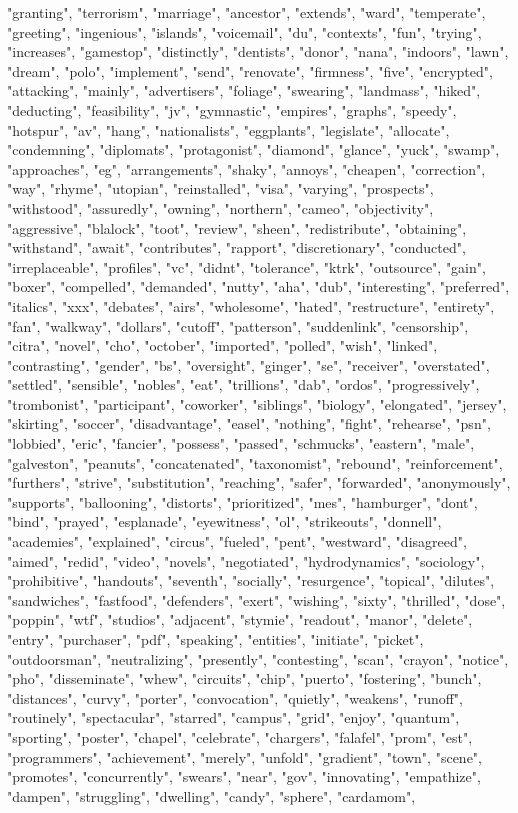 "granting", "terrorism", "marriage", "ancestor", "extends", "ward", "temperate", "greeting", "ingenious", "islands", "voicemail", "du", "contexts", "fun", "trying", "increases", "gamestop", "distinctly", "dentists", "donor", "nana", "indoors", "lawn", "dream", "polo", "implement", "send", "renovate", "firmness", "five", "encrypted", "attacking", "mainly", "advertisers", "foliage", "swearing", "landmass", "hiked", "deducting", "feasibility", "jv", "gymnastic", "empires", "graphs", "speedy", "hotspur", "av", "hang", "nationalists", "eggplants", "legislate", "allocate", "condemning", "diplomats", "protagonist", "diamond", "glance", "yuck", "swamp", "approaches", "eg", "arrangements", "shaky", "annoys", "cheapen", "correction", "way", "rhyme", "utopian", "reinstalled", "visa", "varying", "prospects", "withstood", "assuredly", "owning", "northern", "cameo", "objectivity", "aggressive", "blalock", "toot", "review", "sheen", "redistribute", "obtaining", "withstand", "await", "contributes", "rapport", "discretionary", "conducted", "irreplaceable", "profiles", "vc", "didnt", "tolerance", "ktrk", "outsource", "gain", "boxer", "compelled", "demanded", "nutty", "aha", "dub", "interesting", "preferred", "italics", "xxx", "debates", "airs", "wholesome", "hated", "restructure", "entirety", "fan", "walkway", "dollars", "cutoff", "patterson", "suddenlink", "censorship", "citra", "novel", "cho", "october", "imported", "polled", "wish", "linked", "contrasting", "gender", "bs", "oversight", "ginger", "se", "receiver", "overstated", "settled", "sensible", "nobles", "eat", "trillions", "dab", "ordos", "progressively", "trombonist", "participant", "coworker", "siblings", "biology", "elongated", "jersey", "skirting", "soccer", "disadvantage", "easel", "nothing", "fight", "rehearse", "psn", "lobbied", "eric", "fancier", "possess", "passed", "schmucks", "eastern", "male", "galveston", "peanuts", "concatenated", "taxonomist", "rebound", "reinforcement", "furthers", "strive", "substitution", "reaching", "safer", "forwarded", "anonymously", "supports", "ballooning", "distorts", "prioritized", "mes", "hamburger", "dont", "bind", "prayed", "esplanade", "eyewitness", "ol", "strikeouts", "donnell", "academies", "explained", "circus", "fueled", "pent", "westward", "disagreed", "aimed", "redid", "video", "novels", "negotiated", "hydrodynamics", "sociology", "prohibitive", "handouts", "seventh", "socially", "resurgence", "topical", "dilutes", "sandwiches", "fastfood", "defenders", "exert", "wishing", "sixty", "thrilled", "dose", "poppin", "wtf", "studios", "adjacent", "stymie", "readout", "manor", "delete", "entry", "purchaser", "pdf", "speaking", "entities", "initiate", "picket", "outdoorsman", "neutralizing", "presently", "contesting", "scan", "crayon", "notice", "pho", "disseminate", "whew", "circuits", "chip", "puerto", "fostering", "bunch", "distances", "curvy", "porter", "convocation", "quietly", "weakens", "runoff", "routinely", "spectacular", "starred", "campus", "grid", "enjoy", "quantum", "sporting", "poster", "chapel", "celebrate", "chargers", "falafel", "prom", "est", "programmers", "achievement", "merely", "unfold", "gradient", "town", "scene", "promotes", "concurrently", "swears", "near", "gov", "innovating", "empathize", "dampen", "struggling", "dwelling", "candy", "sphere", "cardamom", 